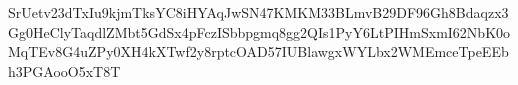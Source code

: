 \documentclass[]{book}
\newenvironment{Shaded}{\begin{snugshade}}{\end{snugshade}}
\newcommand{\NormalTok}[1]{#1}
\begin{document}
\begin{Shaded}
\begin{Highlighting}[]
SrUetv23dTxIu9kjmTksYC8iHYAqJwSN47KMKM33BLmvB29DF96Gh8Bdaqzx3Gg0HeClyTaqdlZMbt5GdSx4pFczISbbpgmq8gg2QIs1PyY6LtPIHmSxmI62NbK0oMqTEv8G4uZPy0XH4kXTwf2y8rptcOAD57IUBlawgxWYLbx2WMEmceTpeEEbh3PGAooO5xT8T%2B5wbhp3durwtnMC%2FJbK82kH8Gs4WcbucpekTB2mVM%2BzGL0PEa45cK0TcC2zL8wO1%2BInZ1qXH5ghknstumRSR0CtRyazXTfxyMBsH0shDXI%2FoRe4lB8YSeAwDKRYpxquyz2GKHEQELscNF02ljkmrDpf8O4Qi4shFWKZVLJMNFZoxRjC3hetlHe8k5q83uUKBHFHSiIxAQKBeoIo%2B%2Bb217dEEbsDXc7JoZ82s6UI0IAijszl1xnzgC3c%2BVnUZVGS6MehXz7soSHeM4ociiBHgsJKEF%2BXbZUI1RKhoAqhGPz2sqt4fEFKYw8MkT9GtAS2AoDxUek3IIYO%2BTh%2B%2B0syvN7qs5mTPQMtTiq7fG32oANnhVmR7cbbLxtYaTMca%2Bjt7xlqOjvtq%2BONyYOta5%2Bt6%2Ba%2F7utz5M5HSi55GmKDTnLSl2xg%2B2qABZntCxSVdkNaVNPpX0TaAorLTxEiz%2BX8rwyUG6kvwLBFrR91vnKEJdXb%2BpjkUorq0ViG%2BiSJLt4VXNy0NZHEOgsF3yzJ039UaxwhRy1WxiEW6j8hGrRmST2qxuc9%2BsvYm7lXSbbIS4Nnvit%2Bs%2B5wFtDRnqlsJ0bmOzfsDDFFaCKAbUHxUXFUjOyM6h7SQZy5frgl9CERzYlApaPNfyVQ0UdoVHedm2CFC1uo0ioFxKAJnlgT%2FHp%2F8z1BxU%2F6Be8HWDiFKghBV7lay25kSg7U%2B2zFPODdMQ9nuicYQtTNZNCisI8NWf173RJMdvvUz3YqOpLBy1MhTGTR51S8u6wFsKsTbMtTwU49FVV34aUZpqD1oyrxoelyWuSuFQbDFBQpW%2Bk5KouT%2FHozHONHkSOBIh9gyodzXG2Ee3CekxOkjeidGti5UEObtBEwEyOK23lpL%2FSAGtIDhPyo%2B7Pj3Oyu%2BUN9mEZ7WKrCDhuW36E97EfkP63m%2Bm3P5Jyk2etEKYdT5zkIX0ZThX%2BOmuWZP3fjsLnI9641YthRfBYkRXnTZH43asTWDogkR2VVGeDmIuAGDXBzVnCTzmTncIMYPDXcHJWPZYCbi4Cb83D3DXCzgZuOTMxluCGmpHH9wg3v34DQd95JiGzb0zKVtN6exppbELLNUAUDQh%2Fmg4osTvfnd4ZIOowSSiCo7iWprQyhg4EsbNA6tK5EjmSY6f07rBxPVqprySQhPgIV2bbDZZqWHSoy7BU%2BCRUhsX%2F3Y0JFWBKgmENlNddWVlSEuBBAUIkb1tVUBIV6vpCgYswWfRizT7Dfvn8qsp0EOVMg6qmoxVEI1OTqOwUVEbrfNJ1QEeEcUMArW%2BJrK2sqkpRirRBWOFldbU1HBCPMTeyoVNkOIWWzNGwo%2FGAq5Ob8sB%2FhbOTGVztS5AzRYue1zRDijvTLa5hFymTSL0sdxLVbDq1l0cmcpi3BCCCHDfHr7xyOvrlz%2FzkMxnefBkjq1qCFzLhUBzjmLOZtjlMrBhhkAQDFNE19GrQya8klR8QgYlmHwIfqEG0iYrgpQKwPHQJhR0n2hAIoacXGpDQGpTAQRjE%2BJMUQdRCVoHBvy5YwdphSNiBjBqtZw7bKScn21bakenyAgDRkO%2B9RppnbIT9DPNomh6JtAizpwsypW9BOWX1uXEXxYwcrXZ4wxuUB%2B4nR4bUtkVD1IKNLIyFhe%2Bt9RhhWUocZ%2FDGY9EJA15I4CArETBvnidi%2FsvfUxYQnB4ZxAtR3XEcje1pS3EZv7ufkoO32exqiqiG1diFCgPfFuy4%2F54VA50J4bZJYIpPkSFkvlFcOda4lt0oFCepY1yYpYfsqvWR7zYb84hw1Y3c53fx49l%2Fvdbr37aXvbqy0cK2PQwVO2uzB9mn1ebqzvqPHosSIKTdwvH7IjgDo6HxoECCKDX5JvN%2BnWVcf0joqxtLhAnJsyKx8XOU%2BtkrQ445gUiwYS%2FiR4gnP5lRIbSkF7ioOI3%2FsjrUNdaRAcaR%2Buyc1mWrb8G7EC9wnL7h1Rz8nCa6arKUdW0CBKaSvDL7m3fp7WdvhNlDVA6bTQSEmFZUTyTKO3AwZt%2BiR3RI%2BPy8VlpcNos1gYfa3r%2FIn%2BNf86R9fvjw%2B0PnDLb%2B9NnlkSvOcY6OjwF0u%2FVGZIW%2BLc1N6KIsrsR8Dz2schkBbaWBV0BYAO2ao3rSy5sZpxb1WQinK1ghUamvNsSttNWaU1W7zGu5U7RzvliUZ1x6qrL1Qwdy0ugK3khnY4dDIrbsdRHvQutrkfst0%2BHQ0mOH8EWRYeC1ycaifUagBfzuyOtL6Wzj29B3%2FBw%3D%3D"}\NormalTok{)}
\end{Highlighting}
\end{Shaded}
\end{document}
